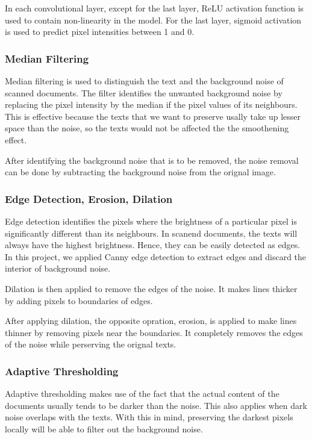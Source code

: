 \documentclass[10pt,twocolumn,letterpaper]{article}
\begin{document}
    In each convolutional layer, except for the last layer, ReLU activation function is used to contain non-linearity in the model. For the last layer, sigmoid activation is used to predict pixel intensities between 1 and 0.

\subsubsection{Median Filtering}
    Median filtering is used to distinguish the text and the background noise of scanned documents. The filter identifies the unwanted background noise by replacing the pixel intensity by the median if the pixel values of its neighbours. This is effective because the texts that we want to preserve usally take up lesser space than the noise, so the texts would not be affected the the smoothening effect.

    After identifying the background noise that is to be removed, the noise removal can be done by subtracting the background noise from the orignal image. 

\subsubsection{Edge Detection, Erosion, Dilation}

    Edge detection identifies the pixels where the brightness of a particular pixel is significantly different than its neighbours. In scanend documents, the texts will always have the highest brightness. Hence, they can be easily detected as edges. In this project, we applied Canny edge detection to extract edges and discard the interior of background noise.

    Dilation is then applied to remove the edges of the noise. It makes lines thicker by adding pixels to boundaries of edges. 

    After applying dilation, the opposite opration, erosion, is applied to make lines thinner by removing pixels near the boundaries. It completely removes the edges of the noise while perserving the orignal texts.

\subsubsection{Adaptive Thresholding}

    Adaptive thresholding makes use of the fact that the actual content of the documents usually tends to be darker than the noise. This also applies when dark noise overlaps with the texts. With this in mind, preserving the darkest pixels locally will be able to filter out the background noise.
\end{document}
